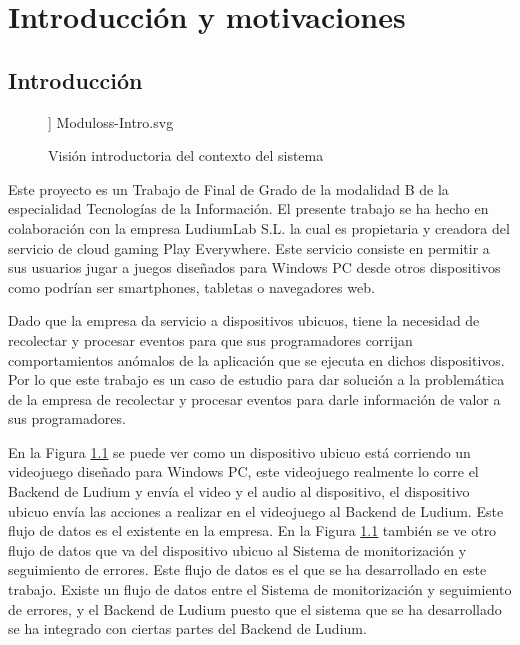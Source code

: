 \chapter{Introducción y motivaciones}

\section{Introducción}

\begin{figure}[!htb]
	\linewidth] {Moduloss-Intro.svg}
	\caption{Visión introductoria del contexto del sistema}
	\label{fig:intro}
\end{figure}

Este proyecto es un Trabajo de Final de Grado de la modalidad B de la especialidad Tecnologías de la Información. El presente trabajo se ha hecho en colaboración con la empresa LudiumLab S.L. la cual es propietaria y creadora del servicio de cloud gaming Play Everywhere. Este servicio consiste en permitir a sus usuarios jugar a juegos diseñados para Windows PC desde otros dispositivos como podrían ser smartphones, tabletas o navegadores web. 

Dado que la empresa da servicio a dispositivos ubicuos, tiene la necesidad de recolectar y procesar eventos para que sus programadores corrijan comportamientos anómalos de la aplicación que se ejecuta en dichos dispositivos. Por lo que este trabajo es un caso de estudio para dar solución a la problemática de la empresa de recolectar y procesar eventos para darle información de valor a sus programadores.

En la Figura \ref{fig:intro} se puede ver como un dispositivo ubicuo está corriendo un videojuego diseñado para Windows PC, este videojuego realmente lo corre el Backend de Ludium y envía el video y el audio al dispositivo, el dispositivo ubicuo envía las acciones a realizar en el videojuego al Backend de Ludium. Este flujo de datos es el existente en la empresa. En la Figura \ref{fig:intro} también se ve otro flujo de datos que va del dispositivo ubicuo al Sistema de monitorización y seguimiento de errores. Este flujo de datos es el que se ha desarrollado en este trabajo. Existe un flujo de datos entre el Sistema de monitorización y seguimiento de errores, y el Backend de Ludium puesto que el sistema que se ha desarrollado se ha integrado con ciertas partes del Backend de Ludium.

